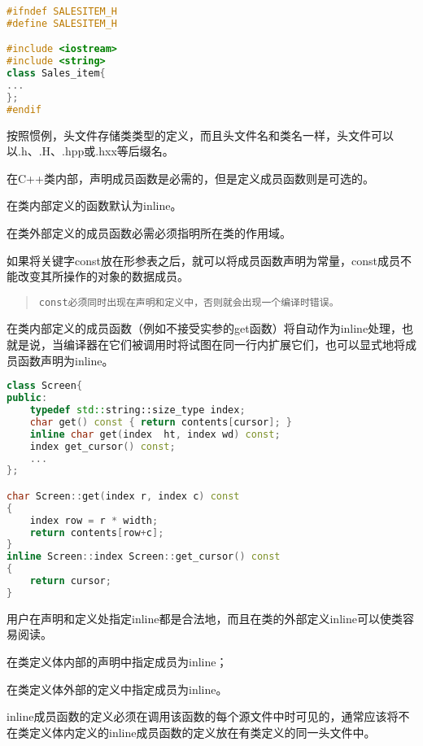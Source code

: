 \begin{lstlisting}[language=C++]
#ifndef SALESITEM_H
#define SALESITEM_H

#include <iostream>
#include <string>
class Sales_item{
...
};
#endif
\end{lstlisting}


按照惯例，头文件存储类类型的定义，而且头文件名和类名一样，头文件可以以.h、.H、.hpp或.hxx等后缀名。

在C++类内部，声明成员函数是必需的，但是定义成员函数则是可选的。

\begin{compactitem}
\item 在类内部定义的函数默认为inline。
\item 在类外部定义的成员函数必需必须指明所在类的作用域。
\end{compactitem}



如果将关键字const放在形参表之后，就可以将成员函数声明为常量，const成员不能改变其所操作的对象的数据成员。

\begin{quote}
\texttt{const必须同时出现在声明和定义中，否则就会出现一个编译时错误。}
\end{quote}

在类内部定义的成员函数（例如不接受实参的get函数）将自动作为inline处理，也就是说，当编译器在它们被调用时将试图在同一行内扩展它们，也可以显式地将成员函数声明为inline。

\begin{lstlisting}[language=C++]
class Screen{
public:
	typedef std::string::size_type index;
	char get() const { return contents[cursor]; }
	inline char get(index  ht, index wd) const;
	index get_cursor() const;
	...
};

char Screen::get(index r, index c) const
{
	index row = r * width;
	return contents[row+c];
}
inline Screen::index Screen::get_cursor() const
{
	return cursor;
}
\end{lstlisting}

用户在声明和定义处指定inline都是合法地，而且在类的外部定义inline可以使类容易阅读。

\begin{compactitem}
\item 在类定义体内部的声明中指定成员为inline；
\item 在类定义体外部的定义中指定成员为inline。
\end{compactitem}

inline成员函数的定义必须在调用该函数的每个源文件中时可见的，通常应该将不在类定义体内定义的inline成员函数的定义放在有类定义的同一头文件中。

